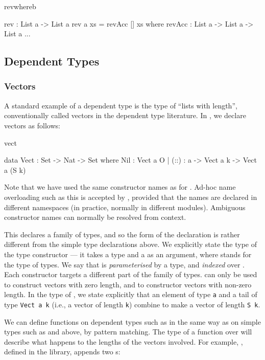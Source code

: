 \begin{SaveVerbatim}{revwhereb}

rev : List a -> List a
rev {a} xs = revAcc [] xs where {
  revAcc : List a -> List a -> List a
  ...
}

\end{SaveVerbatim}

\subsection{Dependent Types}

\subsubsection{Vectors}

A standard example of a dependent type is the type of ``lists with length'',
conventionally called vectors in the dependent type literature. In \Idris{},
we declare vectors as follows:

\begin{SaveVerbatim}{vect}

data Vect : Set -> Nat -> Set where
   Nil  : Vect a O
 | (::) : a -> Vect a k -> Vect a (S k)

\end{SaveVerbatim}

\noindent
Note that we have used the same constructor names as for . Ad-hoc
name overloading such as this is accepted by \Idris{}, provided that the names
are declared in different namespaces (in practice, normally in different modules).
Ambiguous constructor names can normally be resolved from context.

This declares a family of types, and so the form of the declaration is rather
different from the simple type declarations above. We explicitly state the type
of the type constructor  --- it takes a type and a  as an
argument, where  stands for the type of types. We say that 
is \emph{parameterised} by a type, and \emph{indexed} over . Each
constructor targets a different part of the family of types.  can only
be used to construct vectors with zero length, and \tDC{::} to constructor
vectors with non-zero length. In the type of \tDC{::}, we state explicitly that an element
of type \texttt{a} and a tail of type \texttt{Vect a k} (i.e., a vector of length \texttt{k})
combine to make a vector of length \texttt{S k}.

We can define functions on dependent types such as  in the same way
as on simple types such as  and  above, by pattern matching.
The type of a function over  will describe what happens to the
lengths of the vectors involved. For example, , defined in the
library, appends two s:

